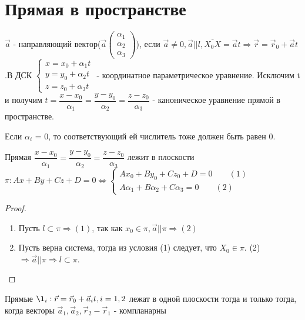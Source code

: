 \section{Прямая в пространстве}
\(\vec a\) - направляющий вектор(\(\vec a\begin{pmatrix}
	\alpha_1 \\ \alpha_2 \\ \alpha_3
\end{pmatrix}\)), если $\vec{a}\ne0, \vec a || l, \overline{X_0X} = \vec at \Longrightarrow \vec r = \vec r_0 + \vec at$.\newline В ДСК \(\left\{
\begin{gathered}
	x = x_0 + \alpha_1t \\
	y = y_0 + \alpha_2t\\
	z = z_0 + \alpha_3t
\end{gathered}
\right.\) - координатное параметрическое уравнение.
Исключим t и получим \(t = \dfrac{x-x_0}{\alpha_1} = \dfrac{y - y_0}{\alpha_2} = \dfrac{z - z_0}{\alpha_3}\) - каноническое уравнение прямой в пространстве.
\begin{note}
	Если \(\alpha_i\) = 0, то соответствующий ей числитель тоже должен быть равен 0.
\end{note}
\begin{proposition}
	Прямая \(\dfrac{x-x_0}{\alpha_1} = \dfrac{y - y_0}{\alpha_2} = \dfrac{z - z_0}{\alpha_3}\) лежит в плоскости $\pi: Ax+By+Cz+D = 0\Longleftrightarrow\left\{\begin{gathered}
		Ax_0+By_0+Cz_0+D = 0\qquad (1)\\
		A\alpha_1 + B\alpha_2 + C\alpha_3 = 0 \qquad (2)
	\end{gathered}\right.$
\end{proposition}
\begin{proof}
	\begin{enumerate}
		\item Пусть \(l\subset \pi \Longrightarrow (1)\), так как \(x_0\in \pi, \vec a||\pi \Longrightarrow (2)	\)
		\item Пусть верна система, тогда из условия (1) следует, что \(X_0\in\pi\). (2) \(\Longrightarrow \vec a || \pi \Longrightarrow l\subset \pi\).
	\end{enumerate}
\end{proof}
\begin{proposition}
	Прямые \(\l_i: \vec r = \vec r_0 + \vec a_it, i = 1, 2\) лежат в одной плоскости тогда и только тогда, когда векторы \(\vec a_1, \vec a_2, \vec r_2 - \vec r_1\) - компланарны
\end{proposition}
